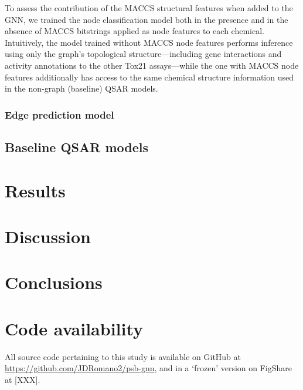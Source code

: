 \documentclass{ws-procs11x85}
\begin{document}
To assess the contribution of the MACCS structural features when added to the GNN, we trained the node classification model both in the presence and in the absence of MACCS bitstrings applied as node features to each chemical. Intuitively, the model trained without MACCS node features performs inference using only the graph's topological structure---including gene interactions and activity annotations to the other Tox21 assays---while the one with MACCS node features additionally has access to the same chemical structure information used in the non-graph (baseline) QSAR models.

\subsubsection{Edge prediction model}

\subsection{Baseline QSAR models}

\section{Results}

\section{Discussion}

\section{Conclusions}

\section{Code availability}
All source code pertaining to this study is available on GitHub at \url{https://github.com/JDRomano2/psb-gnn}, and in a `frozen' version on FigShare at [XXX].



\end{document}
